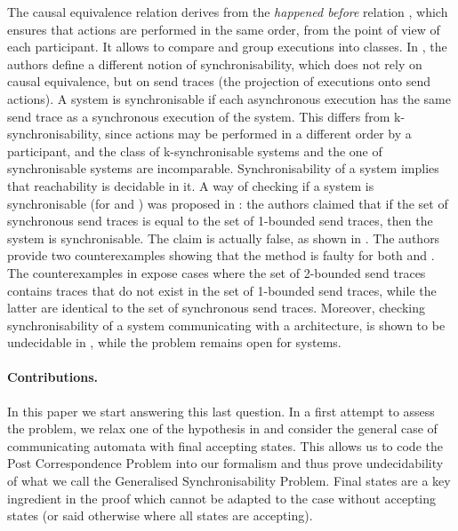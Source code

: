 \documentclass[submission,copyright,creativecommons,UKenglish]{eptcs}
\begin{document}
The causal equivalence relation \cite{digiusto_k-synchronizability_2020} derives from the \emph{happened before} relation \cite{lamport_time_1978}, which ensures that actions are performed in the same order, from the point of view of each participant. It allows to compare and group executions into classes. In \cite{basu_deciding_2016}, the authors define a different notion of synchronisability, which does not rely on causal equivalence, but on send traces (the projection of executions onto send actions). A system is synchronisable if each asynchronous execution has the same send trace as a synchronous execution of the system. 
This differs from k-synchronisability, since actions may be performed in a different order by a participant, and the class of k-synchronisable systems and the one of synchronisable systems are incomparable. 
%
Synchronisability of a system implies that reachability is decidable in it. 
A way of checking if a system is synchronisable (for \Ptp and \Mailbox) was proposed
in \cite{basu_deciding_2016}: the authors claimed that if the set of synchronous send traces is equal to the set of 1-bounded send traces, then the system is synchronisable. The claim is actually false, as shown in \cite{finkel_synchronizability_2017}. The authors  provide two counterexamples showing that the method is faulty for both \Ptp and \Mailbox.  The counterexamples in \cite{finkel_synchronizability_2017} expose cases where the set of 2-bounded send traces contains traces that do not exist in the set of 1-bounded send traces, while the latter are identical to the set of synchronous send traces.
Moreover, checking synchronisability of a system communicating with a  \Ptp architecture, is shown to be undecidable in \cite[Theorem 3]{finkel_synchronizability_2017}, while the  problem remains open for \Mailbox systems. 

\paragraph{Contributions.} In this paper we start answering this last question. In a first attempt to assess the problem, we relax one of the hypothesis in \cite{finkel_synchronizability_2017} and consider the general case of communicating automata with final accepting states. This allows us to code the Post Correspondence Problem into our formalism and thus prove undecidability of what we call the  Generalised Synchronisability Problem.
Final states are a key ingredient in the proof which cannot be  adapted to the case without accepting states (or said otherwise where all states are accepting).
\end{document}
